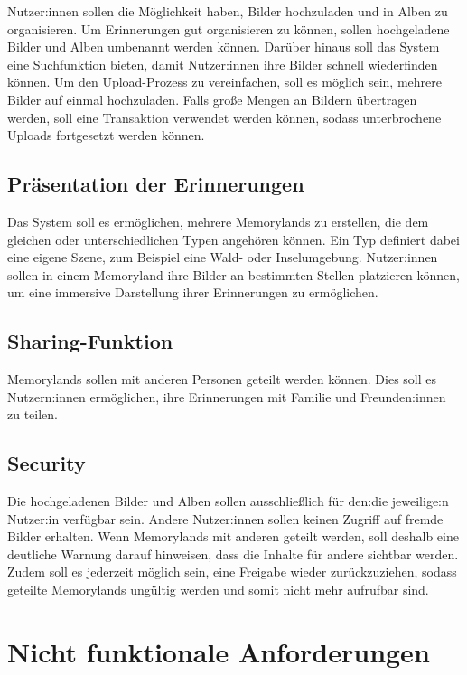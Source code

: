 Nutzer:innen sollen die Möglichkeit haben, Bilder hochzuladen und in Alben zu organisieren. 
Um Erinnerungen gut organisieren zu können, sollen hochgeladene Bilder und Alben 
umbenannt werden können. Darüber hinaus soll das System eine Suchfunktion bieten, 
damit Nutzer:innen ihre Bilder schnell wiederfinden können. Um den Upload-Prozess zu 
vereinfachen, soll es möglich sein, mehrere Bilder auf einmal hochzuladen. Falls 
gro\ss{}e Mengen an Bildern übertragen werden, soll eine Transaktion verwendet werden
können, sodass unterbrochene Uploads fortgesetzt werden können.

\subsection{Präsentation der Erinnerungen}

Das System soll es ermöglichen, mehrere Memorylands zu erstellen, die dem 
gleichen oder unterschiedlichen Typen angehören können. Ein Typ definiert 
dabei eine eigene Szene, zum Beispiel eine Wald- oder Inselumgebung. Nutzer:innen sollen
in einem Memoryland ihre Bilder an bestimmten Stellen platzieren können, um 
eine immersive Darstellung ihrer Erinnerungen zu ermöglichen.

\subsection{Sharing-Funktion}

Memorylands sollen mit anderen Personen geteilt werden können. Dies soll es 
Nutzern:innen ermöglichen, ihre Erinnerungen mit Familie und Freunden:innen zu teilen.

\subsection{Security}

Die hochgeladenen Bilder und Alben sollen ausschlie\ss{}lich für den:die jeweilige:n Nutzer:in
verfügbar sein. Andere Nutzer:innen sollen keinen Zugriff auf fremde Bilder 
erhalten. Wenn Memorylands mit anderen geteilt werden, soll deshalb eine deutliche Warnung 
darauf hinweisen, dass die Inhalte für andere sichtbar werden. Zudem soll es jederzeit 
möglich sein, eine Freigabe wieder zurückzuziehen, sodass geteilte Memorylands ungültig 
werden und somit nicht mehr aufrufbar sind.

\section{Nicht funktionale Anforderungen}


